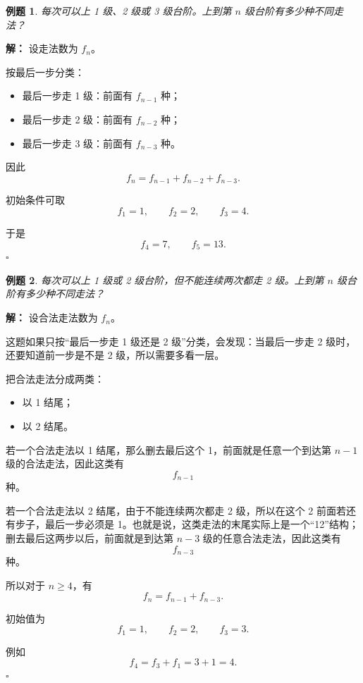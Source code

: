 \documentclass[11pt,a4paper,fontset=fandol]{ctexart}
\theoremstyle{formaltheorem}
\theoremstyle{formalexample}
\newtheorem{example}{例题}[section]
\newenvironment{solution}{\par\noindent\textbf{解：}}{\hfill$\square$\par}
\begin{document}
\begin{example}
每次可以上 1 级、2 级或 3 级台阶。上到第 $n$ 级台阶有多少种不同走法？
\end{example}

\begin{solution}
设走法数为 $f_n$。

按最后一步分类：
\begin{itemize}
  \item 最后一步走 1 级：前面有 $f_{n-1}$ 种；
  \item 最后一步走 2 级：前面有 $f_{n-2}$ 种；
  \item 最后一步走 3 级：前面有 $f_{n-3}$ 种。
\end{itemize}

因此
\[
  f_n=f_{n-1}+f_{n-2}+f_{n-3}.
\]

初始条件可取
\[
  f_1=1,
  \qquad
  f_2=2,
  \qquad
  f_3=4.
\]

于是
\[
  f_4=7,
  \qquad
  f_5=13.
\]
\end{solution}

\begin{example}
每次可以上 1 级或 2 级台阶，但不能连续两次都走 2 级。上到第 $n$ 级台阶有多少种不同走法？
\end{example}

\begin{solution}
设合法走法数为 $f_n$。

这题如果只按“最后一步走 1 级还是 2 级”分类，会发现：当最后一步走 2 级时，还要知道前一步是不是 2 级，所以需要多看一层。

把合法走法分成两类：
\begin{itemize}
  \item 以 1 结尾；
  \item 以 2 结尾。
\end{itemize}

若一个合法走法以 1 结尾，那么删去最后这个 1，前面就是任意一个到达第 $n-1$ 级的合法走法，因此这类有
\[
  f_{n-1}
\]
种。

若一个合法走法以 2 结尾，由于不能连续两次都走 2 级，所以在这个 2 前面若还有步子，最后一步必须是 1。也就是说，这类走法的末尾实际上是一个“12”结构；删去最后这两步以后，前面就是到达第 $n-3$ 级的任意合法走法，因此这类有
\[
  f_{n-3}
\]
种。

所以对于 $n\ge 4$，有
\[
  f_n=f_{n-1}+f_{n-3}.
\]

初始值为
\[
  f_1=1,\qquad f_2=2,\qquad f_3=3.
\]

例如
\[
  f_4=f_3+f_1=3+1=4.
\]
\end{solution}
\end{document}

